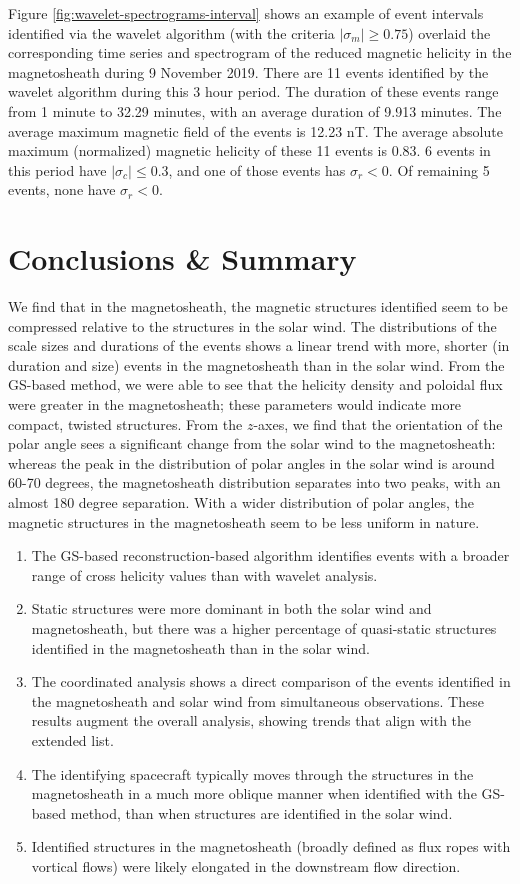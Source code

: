 Figure \ref{fig:wavelet-spectrograms-interval} shows an example of event intervals identified via the wavelet algorithm (with the criteria $|\sigma_m|\geq 0.75$) overlaid the corresponding time series and spectrogram of the reduced magnetic helicity in the magnetosheath during 9 November 2019. There are 11 events identified by the wavelet algorithm during this 3 hour period. The duration of these events range from 1 minute to 32.29 minutes, with an average duration of 9.913 minutes. The average maximum magnetic field of the events is 12.23 nT. The average absolute maximum (normalized) magnetic helicity of these 11 events is 0.83. 6 events in this period have $|\sigma_c|\leq 0.3$, and one of those events has $\sigma_r<0$. Of remaining 5 events, none have $\sigma_r<0$.


\section{Conclusions \& Summary}

We find that in the magnetosheath, the magnetic structures identified seem to be compressed relative to the structures in the solar wind. The distributions of the scale sizes and durations of the events shows a linear trend with more, shorter (in duration and size) events in the magnetosheath than in the solar wind. From the GS-based method, we were able to see that the helicity density and poloidal flux were greater in the magnetosheath; these parameters would indicate more compact, twisted structures. From the $z$-axes, we find that the orientation of the polar angle sees a significant change from the solar wind to the magnetosheath: whereas the peak in the distribution of polar angles in the solar wind is around 60-70 degrees, the magnetosheath distribution separates into two peaks, with an almost 180 degree separation. With a wider distribution of polar angles, the magnetic structures in the magnetosheath seem to be less uniform in nature.

\begin{enumerate}
    \item The GS-based reconstruction-based algorithm identifies events with a broader range of cross helicity values than with wavelet analysis.
    \item Static structures were more dominant in both the solar wind and magnetosheath, but there was a higher percentage of quasi-static structures identified in the magnetosheath than in the solar wind. %
    \item The coordinated analysis shows a direct comparison of the events identified in the magnetosheath and solar wind from simultaneous observations. These results augment the overall analysis, showing trends that align with the extended list.
    \item The identifying spacecraft typically moves through the structures in the magnetosheath in a much more oblique manner when identified with the GS-based method, than when structures are identified in the solar wind.
    \item Identified structures in the magnetosheath (broadly defined as flux ropes with vortical flows) were likely elongated in the downstream flow direction.
\end{enumerate}
